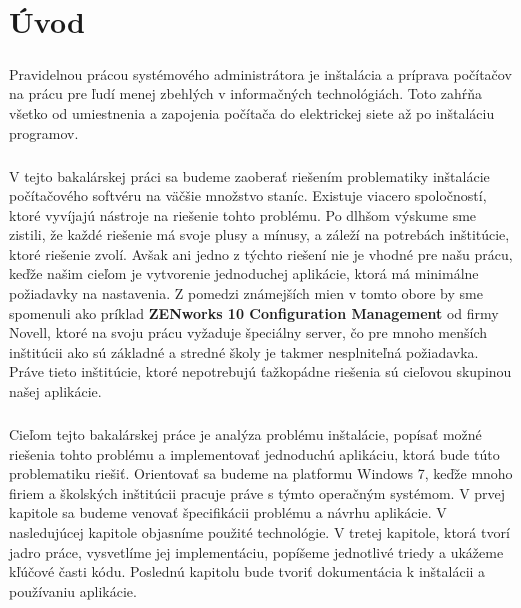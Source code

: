 \chapter*{Úvod}
\paragraph{}
Pravidelnou prácou systémového administrátora je inštalácia a príprava počítačov na prácu pre ľudí menej zbehlých v informačných technológiách. Toto zahŕňa všetko od umiestnenia a zapojenia počítača do elektrickej siete až po inštaláciu programov.

\paragraph{}
V tejto bakalárskej práci sa budeme zaoberať riešením problematiky inštalácie počítačového softvéru na väčšie množstvo staníc. Existuje viacero spoločností, ktoré vyvíjajú nástroje na riešenie tohto problému. Po dlhšom výskume sme zistili, že každé riešenie má svoje plusy a mínusy, a záleží na potrebách inštitúcie, ktoré riešenie zvolí. Avšak ani jedno z týchto riešení nie je vhodné pre našu prácu, keďže našim cieľom je vytvorenie jednoduchej aplikácie, ktorá má minimálne požiadavky na nastavenia. Z pomedzi známejších mien v tomto obore by sme spomenuli ako príklad \textbf{ZENworks 10 Configuration Management} od firmy Novell, ktoré na svoju prácu vyžaduje špeciálny server, čo pre mnoho menších inštitúcii ako sú základné a stredné školy je takmer nesplniteľná požiadavka. Práve tieto inštitúcie, ktoré nepotrebujú ťažkopádne riešenia sú cieľovou skupinou našej aplikácie. 

\paragraph{}
Cieľom tejto bakalárskej práce je analýza problému inštalácie, popísať možné riešenia tohto problému a implementovať jednoduchú aplikáciu, ktorá bude túto problematiku riešiť. Orientovať sa budeme na platformu Windows 7, keďže mnoho firiem a školských inštitúcii pracuje práve s týmto operačným systémom.
V prvej kapitole sa budeme venovať špecifikácii problému a návrhu aplikácie. V nasledujúcej kapitole objasníme použité technológie. V tretej kapitole, ktorá tvorí jadro práce, vysvetlíme jej implementáciu, popíšeme jednotlivé triedy a ukážeme kľúčové časti kódu. Poslednú kapitolu bude tvoriť dokumentácia k inštalácii a používaniu aplikácie.
